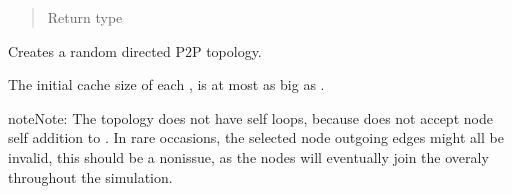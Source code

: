 \documentclass[letterpaper,10pt,english]{sphinxmanual}
\begin{document}
\begin{fulllineitems}
\begin{fulllineitems}
\begin{quote}
\begin{description}
\begin{itemize}
\begin{description}
\end{description}


\end{itemize}

\item[{Return type}] \leavevmode
{}

\end{description}\end{quote}

\end{fulllineitems}


\begin{fulllineitems}
\label{\detokenize{app.domain:app.domain.cluster_groups.NewscastCluster.wire_k_out}}
Creates a random directed P2P topology.

The initial cache size of each {\hyperref[\detokenize{app.domain:app.domain.network_nodes.NewscastNode}]{}}, is at most as big as
{\hyperref[\detokenize{app:app.environment_settings.NEWSCAST_CACHE_SIZE}]{}}.

\begin{sphinxadmonition}{note}{Note:}
The topology does not have self loops, because
{\hyperref[\detokenize{app.domain:app.domain.network_nodes.NewscastNode.add_neighbor}]{}}
does not accept node self addition to
{\hyperref[\detokenize{app.domain:app.domain.network_nodes.NewscastNode.view}]{}}. In rare
occasions, the selected node out\sphinxhyphen{}going edges might all be
invalid, this should be a non\sphinxhyphen{}issue, as the nodes will eventually
join the overaly throughout the simulation.
\end{sphinxadmonition}

\end{fulllineitems}


\end{fulllineitems}

\end{document}
